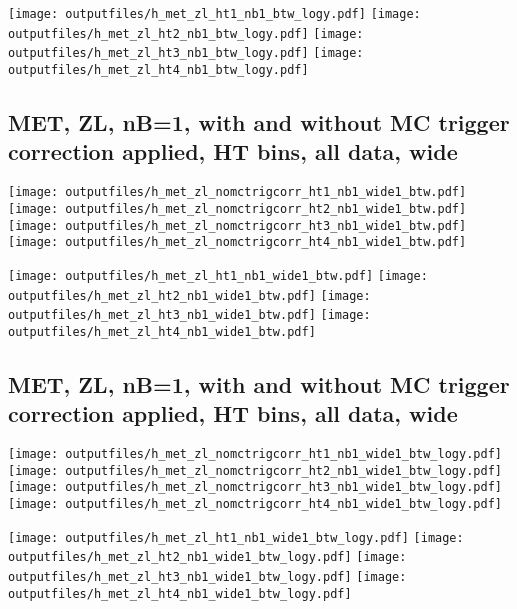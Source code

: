 \documentclass[11pt]{article}
\begin{document}
    \noindent
     \texttt{[image: outputfiles/h\_met\_zl\_ht1\_nb1\_btw\_logy.pdf]}
     \texttt{[image: outputfiles/h\_met\_zl\_ht2\_nb1\_btw\_logy.pdf]}
     \texttt{[image: outputfiles/h\_met\_zl\_ht3\_nb1\_btw\_logy.pdf]}
     \texttt{[image: outputfiles/h\_met\_zl\_ht4\_nb1\_btw\_logy.pdf]}


    \clearpage
     \subsection{ MET, ZL, nB=1, with and without MC trigger correction applied, HT bins, all data, wide}

    \noindent
     \texttt{[image: outputfiles/h\_met\_zl\_nomctrigcorr\_ht1\_nb1\_wide1\_btw.pdf]}
     \texttt{[image: outputfiles/h\_met\_zl\_nomctrigcorr\_ht2\_nb1\_wide1\_btw.pdf]}
     \texttt{[image: outputfiles/h\_met\_zl\_nomctrigcorr\_ht3\_nb1\_wide1\_btw.pdf]}
     \texttt{[image: outputfiles/h\_met\_zl\_nomctrigcorr\_ht4\_nb1\_wide1\_btw.pdf]}

    \noindent
     \texttt{[image: outputfiles/h\_met\_zl\_ht1\_nb1\_wide1\_btw.pdf]}
     \texttt{[image: outputfiles/h\_met\_zl\_ht2\_nb1\_wide1\_btw.pdf]}
     \texttt{[image: outputfiles/h\_met\_zl\_ht3\_nb1\_wide1\_btw.pdf]}
     \texttt{[image: outputfiles/h\_met\_zl\_ht4\_nb1\_wide1\_btw.pdf]}

    \clearpage
     \subsection{ MET, ZL, nB=1, with and without MC trigger correction applied, HT bins, all data, wide}

    \noindent
     \texttt{[image: outputfiles/h\_met\_zl\_nomctrigcorr\_ht1\_nb1\_wide1\_btw\_logy.pdf]}
     \texttt{[image: outputfiles/h\_met\_zl\_nomctrigcorr\_ht2\_nb1\_wide1\_btw\_logy.pdf]}
     \texttt{[image: outputfiles/h\_met\_zl\_nomctrigcorr\_ht3\_nb1\_wide1\_btw\_logy.pdf]}
     \texttt{[image: outputfiles/h\_met\_zl\_nomctrigcorr\_ht4\_nb1\_wide1\_btw\_logy.pdf]}


    \noindent
     \texttt{[image: outputfiles/h\_met\_zl\_ht1\_nb1\_wide1\_btw\_logy.pdf]}
     \texttt{[image: outputfiles/h\_met\_zl\_ht2\_nb1\_wide1\_btw\_logy.pdf]}
     \texttt{[image: outputfiles/h\_met\_zl\_ht3\_nb1\_wide1\_btw\_logy.pdf]}
     \texttt{[image: outputfiles/h\_met\_zl\_ht4\_nb1\_wide1\_btw\_logy.pdf]}
\end{document}
